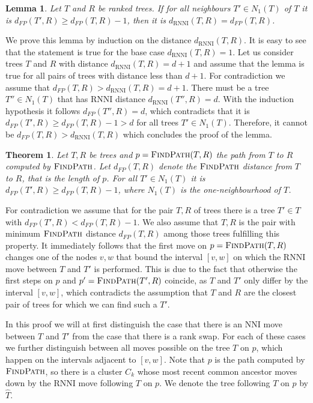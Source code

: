 \documentclass{amsart}
\newtheorem{lemma}{Lemma}
\newtheorem{theorem}{Theorem}
\newcommand{\rnni}{\mathrm{RNNI}}
\newcommand{\findpath}{\textsc{FindPath}}
\newcommand{\nni}{\mathrm{NNI}}
\begin{document}
\begin{lemma}
    Let $T$ and $R$ be ranked trees.
    If for all neighbours $T' \in N_1(T)$ of $T$ it is $d_{FP}(T',R) \geq d_{FP}(T,R) - 1$, then it is $d_{\rnni}(T,R) = d_{FP}(T,R)$.
\end{lemma}

\proof
    We prove this lemma by induction on the distance $d_{\rnni}(T,R)$.
    It is easy to see that the statement is true for the base case $d_{\rnni}(T,R) = 1$.
    Let us consider trees $T$ and $R$ with distance $d_{\rnni}(T,R) = d+1$ and assume that the lemma is true for all pairs of trees with distance less than $d+1$.
    For contradiction we assume that $d_{FP}(T,R) > d_{\rnni}(T,R) = d+1$.
    There must be a tree $T'' \in N_1(T)$ that has $\rnni$ distance $d_{\rnni}(T'',R) = d$.
    With the induction hypothesis it follows $d_{FP}(T'',R) = d$, which contradicts that it is $d_{FP}(T',R) \geq d_{FP}(T,R) - 1 > d$ for all trees $T' \in N_1(T)$.
    Therefore, it cannot be $d_{FP}(T,R) > d_{\rnni}(T,R)$ which concludes the proof of the lemma.
\endproof


\begin{theorem}
Let $T,R$ be trees and $p = \findpath(T,R)$ the path from $T$ to $R$ computed by $\findpath$.
Let $d_{FP}(T,R)$ denote the $\findpath$
distance from $T$ to $R$, that is the length of $p$.
For all $T' \in N_1(T)$ it is $d_{FP}(T',R) \geq d_{FP}(T,R) - 1$, where $N_1(T)$ is the one-neighbourhood of $T$.
\end{theorem}

\proof
For contradiction we assume that for the pair $T,R$ of trees there is a tree $T' \in T$ with $d_{FP}(T',R) < d_{FP}(T,R) - 1$.
We also assume that $T,R$ is the pair with minimum $\findpath$ distance $d_{FP}(T,R)$ among those trees fulfilling this property.
It immediately follows that the first move on $p = \findpath(T,R)$ changes one of the nodes $v,w$ that bound the interval $[v,w]$ on which the $\rnni$ move between $T$ and $T'$ is performed.
This is due to the fact that otherwise the first steps on $p$ and $p' = \findpath(T',R)$ coincide, as $T$ and $T'$ only differ by the interval $[v,w]$, which contradicts the assumption that $T$ and $R$ are the closest pair of trees for which we can find such a $T'$.

In this proof we will at first distinguish the case that there is an $\nni$ move between $T$ and $T'$ from the case that there is a rank swap.
For each of these cases we further distinguish between all moves possible on the tree $T$ on $p$, which happen on the intervals adjacent to $[v,w]$.
Note that $p$ is the path computed by $\findpath$, so there is a cluster $C_k$ whose most recent common ancestor moves down by the $\rnni$ move following $T$ on $p$.
We denote the tree following $T$ on $p$ by $\hat T$.
\end{document}
